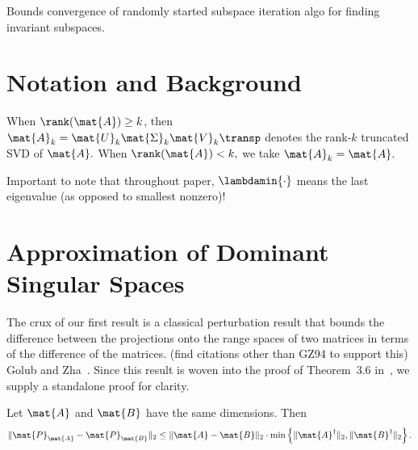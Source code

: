 Bounds convergence of randomly started subspace iteration algo for finding
invariant subspaces.

\section{Notation and Background}
When $\rank(\mat{A}) \geq k$, then $\mat{A}_k = \mat{U}_k \mat{\Sigma}_k
\mat{V}_k\transp$ denotes the rank-$k$ truncated SVD of $\mat{A}.$ When
$\rank(\mat{A}) < k,$ we take $\mat{A}_k = \mat{A}.$

Important to note that throughout paper, $\lambdamin{\cdot}$ means the last
eigenvalue (as opposed to smallest nonzero)!

\section{Approximation of Dominant Singular Spaces}

The crux of our first result is a classical perturbation result that bounds the
difference between the projections onto the range spaces of two matrices in
terms of the difference of the matrices. (find citations other than GZ94 to
support this) %
Golub and Zha~\cite{GZ94}. Since this result is woven into the proof of
Theorem~3.6 in~\cite{GZ94}, we supply a standalone proof for clarity.

\begin{lemma}
\label{ch5:lem:projection-perturbation}
Let $\mat{A}$ and $\mat{B}$ have the same dimensions. Then
\[
\|\mat{P}_{\mat{A}} - \mat{P}_{\mat{B}}\|_2 \leq \|\mat{A} - \mat{B}\|_2 \cdot
\min\left\{\|\mat{A}^\dagger\|_2, \|\mat{B}^\dagger\|_2 \right\}.
\]
\end{lemma}


